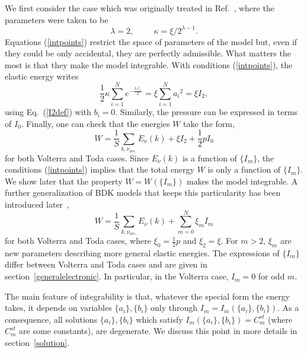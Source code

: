 \documentclass[]{revtex4-1}
\begin{document}
We first consider the case which was originally treated in Ref.~\cite{BDK}, where the parameters were taken to be
\begin{equation}\lambda=2,  \hspace{1cm} \kappa=\xi/2^{\lambda-1}. \label{intpoints} \end{equation} Equations (\ref{intpoints}) restrict the space of parameters of the model but, even if they could be only accidental, they are perfectly admissible. What matters the most is that they make the model integrable. %
With conditions (\ref{intpoints}), the elastic energy writes
\begin{equation}
\frac{1}{2}\kappa \sum_{i=1}^{N}  e^{-\frac{\lambda \ell_i}{2}} =  \xi \sum_{i=1}^{N}  {a_i}^2 = \xi I_2 ,
  \end{equation}
using Eq.~(\ref{I2def}) with $b_i=0$.
Similarly, the pressure can be expressed in terms of $I_0$. Finally, one can check that  the energies $W$ take the form,
\begin{equation}
W=\frac{1}{S}\sum_{k,\nu_{occ.}} E_{\nu}(k) + \xi I_2 + \frac{1}{2} p I_0 
\label{Wminim1}\end{equation}
for both Volterra and Toda cases.
Since $E_{\nu}(k)$ is a function of  $\{I_m\}$, the conditions (\ref{intpoints}) implies that the total energy $W$ is only a function of $\{I_m\}$. We show later that the property $W=W(\{I_m\})$ makes the model integrable.
A further generalization of BDK models that keeps this particularity has been introduced later~\cite{DK},
\begin{equation}
W= \frac{1}{S}\sum_{k,\nu_{occ.}} E_{\nu}(k)  + \sum_{m=0}^{N} \xi_m I_m 
\label{Wminim2} \end{equation}
for both Volterra and Toda cases, where $\xi_0=\frac{1}{2}p$ and $\xi_2=\xi$. For $m>2$, $\xi_m$  are new parameters describing more general elastic energies. The expressions of $\{I_m\}$ differ between Volterra and Toda cases and are given in section~\ref{generalelectronic}. In particular, in the Volterra case, $I_m=0$ for odd $m$.

The main feature of integrability is that, whatever the special form the energy takes, it depends on variables $\{a_i\} ,\{b_i\}$ only through $I_m=I_m(\{a_i\},\{b_i\})$.
As a consequence, all solutions $\{a_i\}, \{b_i \}$ which satisfy $I_m(\{a_i\},\{b_i\})=C^{st}_m$ (where $C^{st}_m$ are some constants), are degenerate. %
 We discuss this point in more details in section~\ref{solution}.%
\end{document}
